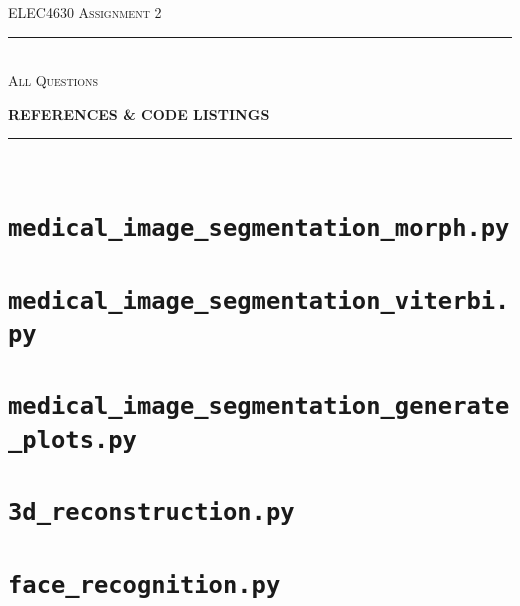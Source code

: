 \begin{titlepage}
  \centering

  \textsc{ELEC4630 Assignment 2}\\
  \vspace{9cm}

  \rule{\linewidth}{0.5pt}\\

  \vspace{1em}
  \LARGE\textsc{All Questions}\\
  \vspace{1em}

  \LARGE\uppercase{\textbf{{References \& Code Listings}}}\\

  \rule{\linewidth}{2pt}\\

  \vfill

\end{titlepage}

\printbibliography

\appendix

\newpage
\section{\texttt{medical\_image\_segmentation\_morph.py}}


\newpage
\section{\texttt{medical\_image\_segmentation\_viterbi.py}}


\newpage
\section{\texttt{medical\_image\_segmentation\_generate\_plots.py}}


\newpage
\section{\texttt{3d\_reconstruction.py}}


\newpage
\section{\texttt{face\_recognition.py}}
